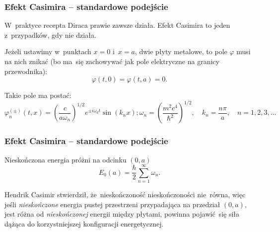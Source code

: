 \documentclass[10pt,t]{beamer}
\begin{document}
\begin{frame}
  \frametitle{Efekt Casimira -- standardowe podejście}


  W~praktyce recepta Diraca prawie zawsze działa. Efekt Casimira to jeden
  z~przypadków, gdy nie działa.

  Jeżeli ustawimy w~punktach $x = 0$ i~$x = a$, dwie płyty metalowe,
  to pole $\varphi$ musi na nich znikać (bo ma~się zachowywać jak
  pole elektryczne na granicy przewodnika):
  \begin{equation}
    \label{eq:O-roznych-06}
    \varphi( t, 0 ) = \varphi( t, a ) = 0.
  \end{equation}

  Takie pole ma postać:
  \begin{subequations}
    \begin{equation}
      \label{eq:O-roznych-07-A}
      \varphi_{ n }^{ ( \pm ) }( t, x ) =
      \left( \frac{ c }{ a \omega_{ n } } \right)^{ 1 / 2 }
      e^{ \pm i \omega_{ k } t } \sin( k_{ n } x );
    \end{equation}
    \begin{equation}
      \label{eq:O-roznych-07-B}
      \omega_{ n } =
      \left( \frac{ m^{ 2 } c^{ 4 } }{ \hbar^{ 2 } } \right)^{ 1 / 2 }, \quad
      k_{ n } = \frac{ n \pi }{ a }, \quad n = 1, 2, 3, \ldots
    \end{equation}
  \end{subequations}

\end{frame}





\begin{frame}
  \frametitle{Efekt Casimira -- standardowe podejście}


  Nieskończona energia próżni na odcinku $( 0, a )$
  \begin{equation}
    \label{eq:O-roznych-08}
    E_{ 0 }( a ) = \frac{ \hbar }{ 2 } \sum_{ n = 1 }^{ \infty } \omega_{ n }.
  \end{equation}

  Hendrik Casimir stwierdził, że~nieskończoność nieskończoności nie~równa,
  więc jeśli \textit{nieskończone} energia pustej przestrzeni przypadająca
  na przedział $( 0, a )$, jest różna od \textit{nieskończonej} energii
  między płytami, powinna pojawić~się siła dążąca do korzystniejszej
  konfiguracji energetycznej.

\end{frame}
\end{document}
